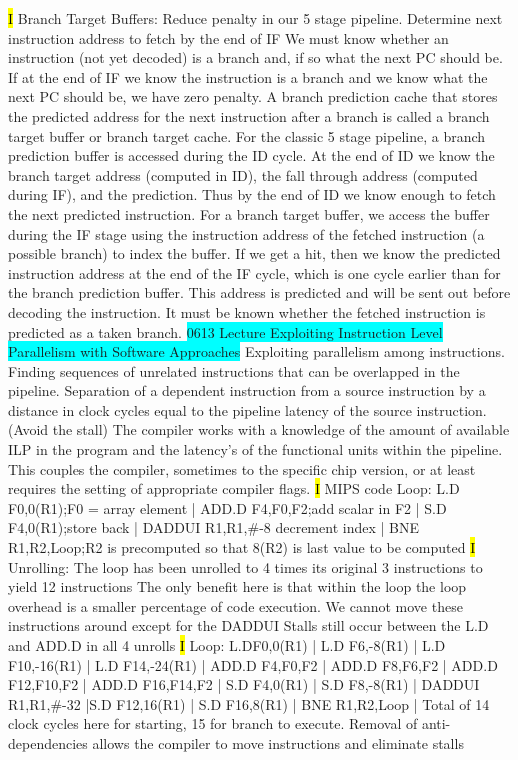 \documentclass[fontsize=4pt]{scrartcl}
\begin{document}
\hl{I}
Branch Target Buffers: Reduce penalty in our 5 stage pipeline. Determine next instruction address to fetch by the end of IF 
We must know whether an instruction (not yet decoded) is a branch and, if so what the next PC should be. If at the end of IF we know the instruction is a branch and we know what the next PC should be, we have zero penalty. A branch prediction cache that stores the predicted address for the next instruction after a branch is called a branch target buffer or branch target cache. For the classic 5 stage pipeline, a branch prediction buffer is accessed during the ID cycle.  At the end of ID we know the branch target address (computed in ID), the fall through address (computed during IF), and the prediction. Thus by the end of ID we know enough to fetch the next predicted instruction. For a branch target buffer, we access the buffer during the IF stage using the instruction address of the fetched instruction (a possible branch) to index the buffer. If we get a hit, then we know the predicted instruction address at the end of the IF cycle, which is one cycle earlier than for the branch prediction buffer. This address is predicted and will be sent out before decoding the instruction.  It must be known whether the fetched instruction is predicted as a taken branch. 
\colorbox{Cyan}{0613 Lecture Exploiting Instruction Level Parallelism with Software Approaches} Exploiting parallelism among instructions. Finding sequences of unrelated instructions that can be overlapped in the pipeline. Separation of a dependent instruction from a source instruction by a distance in clock cycles equal to the pipeline latency of the source instruction. (Avoid the stall) The compiler works with a knowledge of the amount of available  ILP in the program and the latency's of the functional units within the pipeline. This couples the compiler, sometimes to the specific chip version, or at least requires the setting of appropriate compiler flags.
\hl{I}
MIPS code Loop:	L.D	F0,0(R1);F0 = array element | ADD.D	F4,F0,F2;add scalar in F2 | S.D	F4,0(R1);store back | DADDUI R1,R1,\#-8	decrement index | BNE R1,R2,Loop;R2 is precomputed so that 8(R2) is last value to be computed	
\hl{I}
Unrolling: The loop has been unrolled to 4 times its original 3 instructions to yield 12 instructions The only benefit here is that within the loop the loop overhead is a smaller percentage of code execution. We cannot move these instructions around except for the DADDUI Stalls still occur between the L.D and ADD.D in all 4 unrolls
\hl{I}
Loop: L.DF0,0(R1) | L.D	F6,-8(R1) | L.D	F10,-16(R1) | L.D F14,-24(R1) | ADD.D F4,F0,F2 | ADD.D	F8,F6,F2 | ADD.D F12,F10,F2 | ADD.D F16,F14,F2 | S.D	F4,0(R1) | S.D	F8,-8(R1) | DADDUI	R1,R1,\#-32 |S.D	F12,16(R1) | S.D F16,8(R1) | BNE R1,R2,Loop | Total of 14 clock cycles here for starting, 15 for branch to execute. Removal of anti-dependencies allows the compiler to move instructions and eliminate stalls
\end{document}
